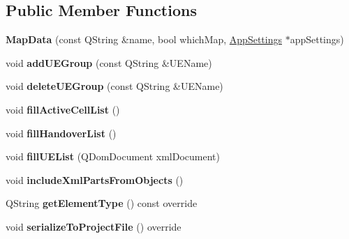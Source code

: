 \subsection*{Public Member Functions}
\begin{DoxyCompactItemize}
\item 
{\bfseries Map\+Data} (const Q\+String \&name, bool which\+Map, \hyperlink{class_app_settings}{App\+Settings} $\ast$app\+Settings)\hypertarget{class_map_data_ad8ef4a63de6fe07cdcd9cdf0494f896f}{}\label{class_map_data_ad8ef4a63de6fe07cdcd9cdf0494f896f}

\item 
void {\bfseries add\+U\+E\+Group} (const Q\+String \&U\+E\+Name)\hypertarget{class_map_data_a7739d74af236a0c4806d9cbf226d72c1}{}\label{class_map_data_a7739d74af236a0c4806d9cbf226d72c1}

\item 
void {\bfseries delete\+U\+E\+Group} (const Q\+String \&U\+E\+Name)\hypertarget{class_map_data_a6f8e09a638b997cf7520b314449ce5e4}{}\label{class_map_data_a6f8e09a638b997cf7520b314449ce5e4}

\item 
void {\bfseries fill\+Active\+Cell\+List} ()\hypertarget{class_map_data_af8d8b19ff5a2216f009785bb4725e491}{}\label{class_map_data_af8d8b19ff5a2216f009785bb4725e491}

\item 
void {\bfseries fill\+Handover\+List} ()\hypertarget{class_map_data_aa5b325bf687daa2af9ef60c4b1f6b651}{}\label{class_map_data_aa5b325bf687daa2af9ef60c4b1f6b651}

\item 
void {\bfseries fill\+U\+E\+List} (Q\+Dom\+Document xml\+Document)\hypertarget{class_map_data_a2ab06ade7342463696b7d7c89c6aae15}{}\label{class_map_data_a2ab06ade7342463696b7d7c89c6aae15}

\item 
void {\bfseries include\+Xml\+Parts\+From\+Objects} ()\hypertarget{class_map_data_acbbcfb6185d087152bbdb93f7a64cd47}{}\label{class_map_data_acbbcfb6185d087152bbdb93f7a64cd47}

\item 
Q\+String {\bfseries get\+Element\+Type} () const override\hypertarget{class_map_data_a3a8668925fa56ad48ddb3b657fa843d4}{}\label{class_map_data_a3a8668925fa56ad48ddb3b657fa843d4}

\item 
void {\bfseries serialize\+To\+Project\+File} () override\hypertarget{class_map_data_a1ccd88e0a96244bc485132292a9b4fe0}{}\label{class_map_data_a1ccd88e0a96244bc485132292a9b4fe0}


\end{DoxyCompactItemize}
